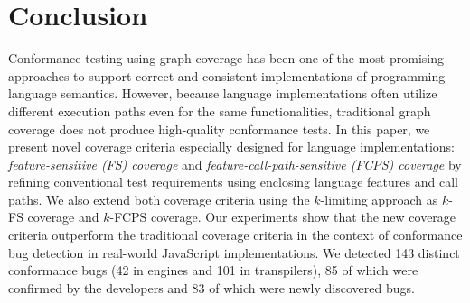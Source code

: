 \section{Conclusion}\label{sec:conclusion}
Conformance testing using graph coverage has been one of the most
promising approaches to support correct and consistent implementations
of programming language semantics.
However, because language implementations often utilize 
different execution paths even for the same functionalities,
traditional graph coverage does not produce high-quality conformance tests.
In this paper, we present novel coverage criteria especially designed
for language implementations: \textit{feature-sensitive (FS) coverage} and
\textit{feature-call-path-sensitive (FCPS) coverage}
by refining conventional test requirements using
enclosing language features and call paths.
We also extend both coverage criteria using the $k$-limiting approach as
$k$-FS coverage and $k$-FCPS coverage.
Our experiments show that the new coverage criteria outperform the
traditional coverage criteria in the context of conformance bug detection in
real-world JavaScript implementations.
We detected 143 distinct conformance bugs (42 in engines
and 101 in transpilers), 85 of which were confirmed by the
developers and 83 of which were newly discovered bugs.
